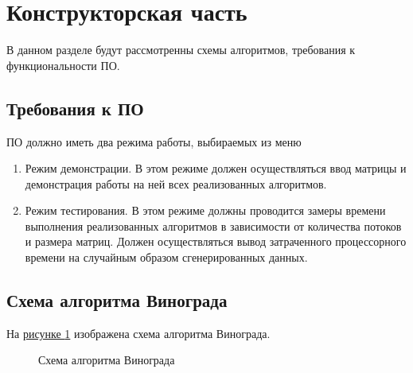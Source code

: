 \documentclass{article}
\begin{document}
	\newpage
	\section{Конструкторская часть}
		В данном разделе будут рассмотренны схемы алгоритмов, требования к функциональности ПО.
		\subsection{Требования к ПО} 
		ПО должно иметь два режима работы, выбираемых из меню
		\begin{enumerate}
			\item Режим демонстрации. В этом режиме должен осуществляться ввод матрицы и демонстрация работы на ней всех реализованных алгоритмов.
		 	\item Режим тестирования. В этом режиме должны проводится замеры времени выполнения реализованных алгоритмов в зависимости от количества потоков и размера матриц. Должен осуществляться вывод затраченного процессорного времени на случайным образом сгенерированных данных.
	 	\end{enumerate}
	 	
	 	\subsection{Схема алгоритма Винограда}
	 	
	На \hyperref[vinogradAlgo]{рисунке  \ref{vinogradAlgo}} изображена схема алгоритма Винограда.
	\begin{figure}[h!]
		\caption{Схема алгоритма Винограда}
		\label{vinogradAlgo}
	\end{figure}
	\newpage
\end{document}
